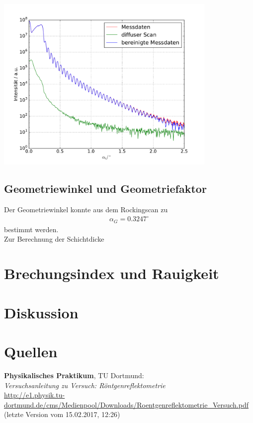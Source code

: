 \documentclass[captions=tableheading]{scrartcl}
\begin{document}
\begin{center}
	\includegraphics[width=0.8\textwidth]{images/rawdata.pdf}
	\label{fig:diffus}
\end{center}

\subsection{Geometriewinkel und Geometriefaktor}
Der Geometriewinkel konnte aus dem Rockingscan zu
\begin{align*}
\alpha_G=0.3247^{\circ}
\end{align*}
bestimmt werden. \\
Zur Berechnung der Schichtdicke
\section{Brechungsindex und Rauigkeit}

\section{Diskussion}

\section{Quellen}
\begin{enumerate}[label={[\arabic*]}]
\item \label{q:anleitung} \textbf{Physikalisches Praktikum}, TU Dortmund: \\
\textit{Versuchsanleitung zu Versuch: Röntgenreflektometrie} \\
\url{http://e1.physik.tu-dortmund.de/cms/Medienpool/Downloads/Roentgenreflektometrie_Versuch.pdf} (letzte Version vom 15.02.2017, 12:26)
\end{enumerate}
\end{document}

